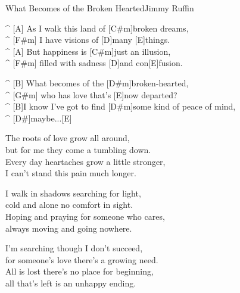 \begin{song}{What Becomes of the Broken Hearted}{Jimmy Ruffin}

\vspace{-0.7cm}
\begin{guitar}
^ [A] As I walk this land of [C#m]broken dreams, \\
^ [F#m]  I have visions of [D]many [E]things. \\
^ [A] But happiness is [C#m]just an illusion, \\
^ [F#m] filled with sadness [D]and con[E]fusion. \\
\end{guitar}

\begin{guitar}
^ [B] What becomes of the [D#m]broken-hearted, \\
^ [G#m] who has love that's [E]now departed? \\
^ [B]I know I've got to find [D#m]some kind of peace of mind, \\
^ [D#]maybe...[E]\\
\end{guitar}

\begin{guitar}
The roots of love grow all around, \\
but for me they come a tumbling down. \\
Every day heartaches grow a little stronger, \\
I can't stand this pain much longer. \\
\end{guitar}

\begin{guitar}
I walk in shadows searching for light, \\
cold and alone no comfort in sight. \\
Hoping and praying for someone who cares, \\
always moving and going nowhere.\\
\end{guitar}


\begin{guitar}
I'm searching though I don't succeed, \\
for someone's love there's a growing need. \\
All is lost there's no place for beginning, \\
all that's left is an unhappy ending. \\
\end{guitar}


\end{song}

